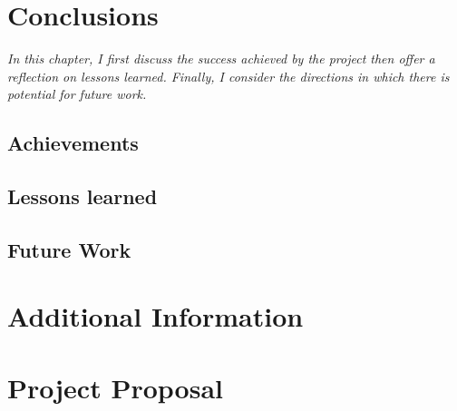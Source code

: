 \documentclass[12pt,a4paper,twoside,openright]{report}
\theoremstyle{definition}
\begin{document}
\chapter{Conclusions}
\textit{In this chapter, I first discuss the success achieved by the project then offer a reflection on lessons learned. Finally, I consider the directions in which there is potential for future work.}
\section{Achievements}

\section{Lessons learned}

\section{Future Work}




\nocite{*}
% 




\appendix

\chapter{Additional Information}

%
%
%
%
%


\chapter{Project Proposal}


\end{document}
